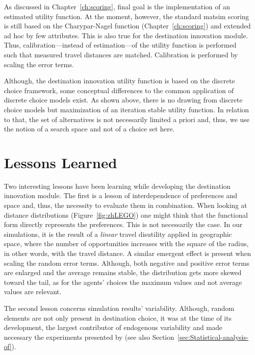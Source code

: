 As discussed in Chapter~\ref{ch:scoring}, final goal is the implementation of an estimated utility function. 
At the moment, however, the standard \gls{matsim} scoring is still based on the Charypar-Nagel function (Chapter~\ref{ch:scoring}) and extended ad hoc by few attributes. 
This is also true for the destination innovation module. 
Thus, calibration---instead of estimation---of the utility function is performed such that measured travel distances are matched. 
Calibration is performed by scaling the error terms. 

Although, the destination innovation utility function is based on the discrete choice framework, some conceptual differences to the common application of discrete choice models exist. 
As shown above, there is no drawing from discrete choice models but maximization of an iteration stable utility function. 
In relation to that, the set of alternatives is not necessarily limited a priori and, thus, we use the notion of a search space and not of a choice set here.

\section{Lessons Learned}
Two interesting lessons have been learning while developing the destination innovation module. 
The first is a lesson of interdependence of preferences and space and,  thus, the necessity to evaluate them in combination. 
When looking at distance distributions (\eg Figure~\ref{fig:zhLEGO}) one might think that the functional form directly represents the preferences. 
This is not necessarily the case. 
In our simulations, it is the result of a \emph{linear} travel disutility applied in geographic space, where the number of opportunities increases with the square of the radius, in other words, with the travel distance. 
A similar emergent effect is present when scaling the random error terms. 
Although, both negative and positive error terms are enlarged and the average remains stable, the distribution gets more skewed toward the tail, as for the agents' choices the maximum values and not average values are relevant.

The second lesson concerns simulation results' variability. 
Although, random elements are not only present in destination choice, it was at the time of its development, the largest contributor of endogenous variability and made necessary the experiments presented by \citet[][]{HorniEtAl_TechRep_IVT_2011_b} (see also Section~\ref{sec:Statistical-analysis-of}).

